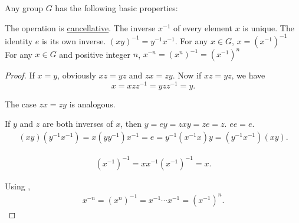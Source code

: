\begin{proposition}\label{thm:group_properties}
  Any group \( G \) has the following basic properties:
  \begin{PropEnum}
     The operation is \hyperref[def:algebraic_theory/cancellative]{cancellative}.
     The inverse \( x^{-1} \) of every element \( x \) is unique.
     The identity \( e \) is its own inverse.
     \( (xy)^{-1} = y^{-1} x^{-1} \).
     For any \( x \in G \), \( x = (x^{-1})^{-1} \)
     For any \( x \in G \) and positive integer \( n \), \( x^{-n} = (x^n)^{-1} = (x^{-1})^n \)
  \end{PropEnum}
\end{proposition}
\begin{proof}
   If \( x = y \), obviously \( xz = yz \) and \( zx = zy \). Now if \( xz = yz \), we have
  \begin{equation*}
    x = xzz^{-1} = yzz^{-1} = y.
  \end{equation*}

  The case \( zx = zy \) is analogous.

   If \( y \) and \( z \) are both inverses of \( x \), then \( y = ey = zxy = ze = z \).
   \( ee = e \).
  \begin{align*}
    (xy) (y^{-1} x^{-1})
    =
    x (y y^{-1}) x^{-1}
    =
    e
    =
    y^{-1} (x^{-1} x) y
    =
    (y^{-1} x^{-1}) (xy).
  \end{align*}

  \begin{align*}
    (x^{-1})^{-1}
    =
    x x^{-1} (x^{-1})^{-1}
    =
    x.
  \end{align*}

   Using ,
  \begin{align*}
    x^{-n}
    =
    (x^n)^{-1}
    =
    x^{-1} \cdots x^{-1}
    =
    (x^{-1})^n.
  \end{align*}
\end{proof}

